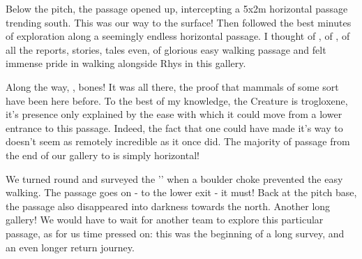 Below the pitch, the passage opened up, intercepting a 5x2m horizontal passage trending south. This was our way to the surface! Then followed the best minutes of exploration along a seemingly endless horizontal passage. I thought of , of , of all the reports, stories, tales even, of glorious easy walking passage and felt immense pride in walking alongside Rhys in this gallery. 

Along the way, , bones! It was all there, the proof that mammals of some sort have been here before. To the best of my knowledge, the Creature is trogloxene, it's presence only explained by the ease with which it could move from a lower entrance to this passage. Indeed, the fact that one could have made it's way to  doesn't seem as remotely incredible as it once did. The majority of passage from the end of our gallery to  is simply horizontal! 

We turned round and surveyed the '' when a boulder choke prevented the easy walking. The passage goes on - to the lower exit - it must! Back at the pitch base, the passage also disappeared into darkness towards the north. Another long gallery! We would have to wait for another team to explore this particular passage, as for us time pressed on: this was the beginning of a long survey, and an even longer return journey.

